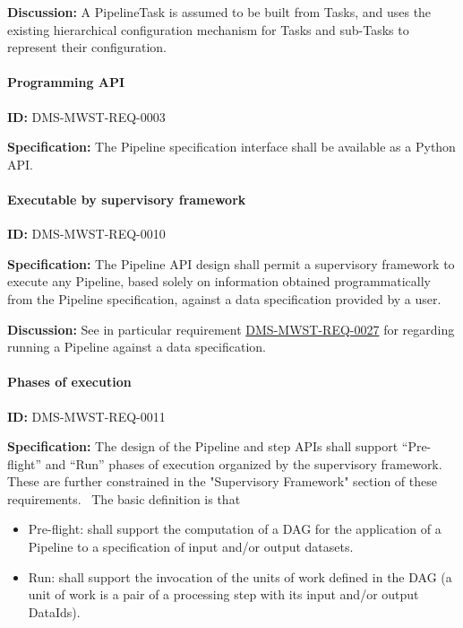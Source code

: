 \documentclass[SE,toc,lsstdraft]{lsstdoc}
\begin{document}
\textbf{Discussion:}
A PipelineTask is assumed to be built from Tasks, and uses the existing hierarchical configuration mechanism for Tasks and sub-Tasks to represent their configuration.

\paragraph{Programming API}\hfill  %

\label{DMS-MWST-REQ-0003}
\textbf{ID:} DMS-MWST-REQ-0003

\textbf{Specification:}
The Pipeline specification interface shall be available as a Python API.

\paragraph{Executable by supervisory framework}\hfill  %

\label{DMS-MWST-REQ-0010}
\textbf{ID:} DMS-MWST-REQ-0010

\textbf{Specification:}
The Pipeline API design shall permit a supervisory framework to execute any Pipeline, based solely on information obtained programmatically from the Pipeline specification, against a data specification provided by a user.

\textbf{Discussion:}
See in particular requirement \hyperref[DMS-MWST-REQ-0027]{DMS-MWST-REQ-0027} for regarding running a Pipeline against a data specification.

\paragraph{Phases of execution}\hfill  %

\label{DMS-MWST-REQ-0011}
\textbf{ID:} DMS-MWST-REQ-0011

\textbf{Specification:}
The design of the Pipeline and step APIs shall support “Pre-flight” and “Run” phases of execution organized by the supervisory framework. These are further constrained in the "Supervisory Framework" section of these requirements.  The basic definition is that

    \begin{itemize}
\item
Pre-flight: shall support the computation of a DAG for the application of a Pipeline to a specification of input and/or output datasets.

\item
Run: shall support the invocation of the units of work defined in the DAG (a unit of work is a pair of a processing step with its input and/or output DataIds).

    \end{itemize}
\end{document}
